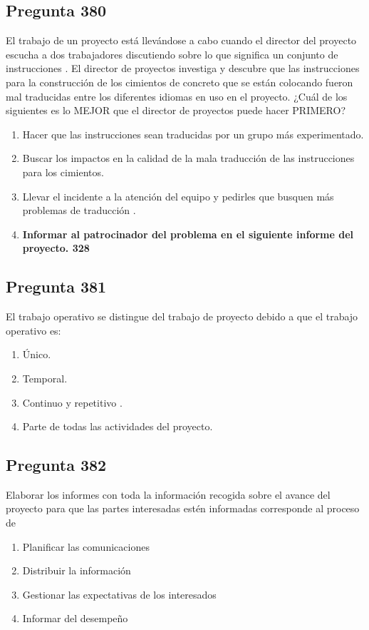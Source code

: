 \documentclass[11pt,a4paper]{article}
\begin{document}
\subsection*{Pregunta 380}
El trabajo de un proyecto está llevándose a cabo cuando el director del proyecto escucha a dos trabajadores discutiendo sobre lo que significa un conjunto de instrucciones . El director de proyectos investiga y descubre que las instrucciones para la construcción de los cimientos de concreto que se están colocando fueron mal traducidas entre los diferentes idiomas en uso en el proyecto. ¿Cuál de los siguientes es lo MEJOR que el director de proyectos puede hacer PRIMERO?

\begin{enumerate}[label=\alph*)]
  \item Hacer que las instrucciones sean traducidas por un grupo más experimentado.
  \item Buscar los impactos en la calidad de la mala traducción de las instrucciones para los cimientos.
  \item Llevar el incidente a la atención del equipo y pedirles que busquen más problemas de traducción .
  \item \textbf{Informar al patrocinador del problema en el siguiente informe del proyecto. 328}
\end{enumerate}

\subsection*{Pregunta 381}
El trabajo operativo se distingue del trabajo de proyecto debido a que el trabajo operativo es:

\begin{enumerate}[label=\alph*)]
  \item Único.
  \item Temporal.
  \item Continuo y repetitivo .
  \item Parte de todas las actividades del proyecto.
\end{enumerate}

\subsection*{Pregunta 382}
Elaborar los informes con toda la información recogida sobre el avance del proyecto para que las partes interesadas estén informadas corresponde al proceso de

\begin{enumerate}[label=\alph*)]
  \item Planificar las comunicaciones
  \item Distribuir la información
  \item Gestionar las expectativas de los interesados
  \item Informar del desempeño
\end{enumerate}
\end{document}
